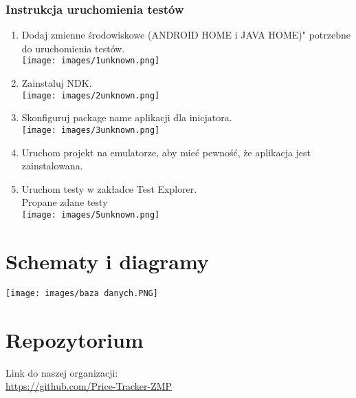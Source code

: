 \documentclass{article}
\begin{document}
        \subsubsection{Instrukcja uruchomienia testów}
             \begin{enumerate}
                \item Dodaj zmienne środowiskowe (ANDROID HOME i JAVA HOME)" potrzebne do uruchomienia testów.\\
                    \texttt{[image: images/1unknown.png]}\\
                \item Zainstaluj NDK.\\
                    \texttt{[image: images/2unknown.png]}\\
                \item Skonfiguruj package name aplikacji dla inicjatora.\\
                    \texttt{[image: images/3unknown.png]}\\
                \item Uruchom projekt na emulatorze, aby mieć pewność, że aplikacja jest zainstalowana.\\
                \item Uruchom testy w zakładce Test Explorer.\\
                Propane zdane testy\\
                    \texttt{[image: images/5unknown.png]}\\
        \end{enumerate}

\section{Schematy i diagramy}
    \texttt{[image: images/baza danych.PNG]}\\
    
\section{Repozytorium}
Link do naszej organizacji: \\
\url{https://github.com/Price-Tracker-ZMP}\\\\
\end{document}
